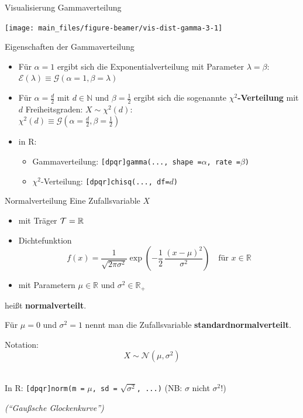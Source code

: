 \documentclass[
  10pt,
  ignorenonframetext,
]{beamer}
\providecommand{\tightlist}{%
  \setlength{\itemsep}{0pt}\setlength{\parskip}{0pt}}
\begin{document}
\begin{frame}{Visualisierung Gammaverteilung}
\label{visualisierung-gammaverteilung-2}
\scriptsize

\begin{center}\texttt{[image: main\_files/figure-beamer/vis-dist-gamma-3-1]} \end{center}

\normalsize
\end{frame}

\begin{frame}[fragile]{Eigenschaften der Gammaverteilung}
\label{eigenschaften-der-gammaverteilung}
\begin{itemize}
\item
  Für \(\alpha = 1\) ergibt sich die Exponentialverteilung mit Parameter
  \(\lambda = \beta\):\\
  \(\mathcal{E}(\lambda) \equiv \mathcal{G}(\alpha = 1, \beta = \lambda)\)
\item
  Für \(\alpha = \tfrac{d}{2}\) mit \(d \in \mathbb{N}\) und
  \(\beta = \frac{1}{2}\) ergibt sich die sogenannte
  \(\chi^2\)\textbf{-Verteilung} mit \(d\) Freiheitsgraden:
  \(X \sim \chi^2(d)\):\\
  \(\chi^2(d) \equiv \mathcal{G}(\alpha = \tfrac{d}{2}, \beta = \frac{1}{2})\)
\item
  in R:

  \begin{itemize}
  \tightlist
  \item
    Gammaverteilung:
    \texttt{{[}dpqr{]}gamma(...,\ shape\ =}\(\alpha\)\texttt{,\ rate\ =}\(\beta\)\texttt{)}
  \item
    \(\chi^2\)-Verteilung:
    \texttt{{[}dpqr{]}chisq(...,\ df=}\(d\)\texttt{)}
  \end{itemize}
\end{itemize}
\end{frame}

\begin{frame}[fragile]{Normalverteilung}
\label{normalverteilung}
Eine Zufallsvariable \(X\)

\begin{itemize}
\tightlist
\item
  mit Träger \({\cal T} = \mathbb{R}\)
\item
  Dichtefunktion \[
  f(x) = \frac{1}{\sqrt{2 \pi \sigma^2}} \exp \left(-\frac{1}{2} \, \frac{(x - \mu)^2}{\sigma^2} \right)
  \quad \mbox{für } x \in \mathbb{R}
  \]
\item
  mit Parametern \(\mu \in \mathbb{R}\) und
  \(\sigma^2 \in \mathbb{R}_+\)
\end{itemize}

heißt \textbf{normalverteilt}.~

Für \(\mu = 0\) und \(\sigma^2 = 1\) nennt man die Zufallsvariable
\textbf{standardnormalverteilt}.~

Notation: \[X \sim {\mathcal N}(\mu, \sigma^2)\]~

In R: \texttt{{[}dpqr{]}norm(m\ =} \(\mu\)\texttt{,\ sd\ =}
\(\sqrt{\sigma^2}\)\texttt{,\ ...)} (NB: \(\sigma\) nicht \(\sigma^2\)!)

\emph{(``Gaußsche Glockenkurve'')}
\end{frame}
\end{document}
